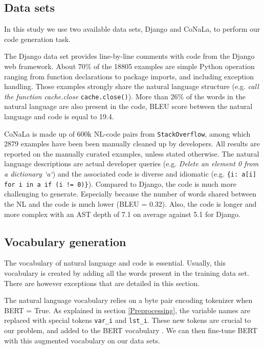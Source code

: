 \documentclass[11pt]{article}
\newcommand{\var}{\sc}
\begin{document}
\subsection{Data sets}

In this study we use two available data sets, {\selectfont Django} and {\selectfont CoNaLa}, to perform our code generation task. 

The {\selectfont Django} data set provides line-by-line comments with code from the {\selectfont Django} web framework. About 70\% of the 18805 examples are simple Python operation ranging from function declarations to package imports, and including exception handling.
Those examples strongly share the natural language structure (e.g. {\it call the function cache.close}  \texttt{cache.close()}). More than 26\% of the words in the natural language are also present in the code, BLEU score between the natural language and code is equal to 19.4.


{\selectfont CoNaLa} is made up of 600k NL-code pairs from {\tt StackOverflow}, among which 2879 examples have been been manually cleaned up by developers. All results are reported on the manually curated examples, unless stated otherwise. The natural language descriptions are actual developer queries (e.g. {\it Delete an element 0 from a dictionary `a`}) and the associated code is diverse and idiomatic ({e.g. \tt \{i: a[i] for i in a if (i != 0)\}}). Compared to {\selectfont Django}, the code is much more challenging to generate. Especially because the number of words shared between the NL and the code is much lower (BLEU = 0.32). Also, the code is longer and more complex with an AST depth of 7.1 on average against 5.1 for {\selectfont Django}.



\subsection{Vocabulary generation}

The vocabulary of natural language and code is essential. Usually, this vocabulary is created by adding all the words present in the training data set. There are however exceptions that are detailed in this section.

The natural language vocabulary relies on a byte pair encoding tokenizer when {\var BERT = True}. As explained in section \ref{Preprocessing}, the variable names are replaced with special tokens \texttt{var\_i} and \texttt{lst\_i}. These new tokens are crucial to our problem, and added to the BERT vocabulary . We can then fine-tune BERT with this augmented vocabulary on our data sets.
\end{document}
